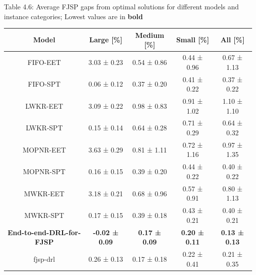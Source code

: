 \begin{table}
    Table 4.6: Average FJSP gaps from optimal solutions for different models and instance categories; Lowest values are in \textbf{bold}\\
    \vspace{1mm}
    \label{table:4.4}
    \footnotesize 
    \begin{tabular}{ccccc}
        \toprule
        Model & Large [\%] & Medium [\%] & Small [\%] & All [\%] \\
        \midrule
        FIFO-EET & 3.03 ± 0.23 & 0.54 ± 0.86 & 0.44 ± 0.96 & 0.67 ± 1.13 \\
        FIFO-SPT & 0.06 ± 0.12 & 0.37 ± 0.20 & 0.41 ± 0.22 & 0.37 ± 0.22 \\
        LWKR-EET & 3.09 ± 0.22 & 0.98 ± 0.83 & 0.91 ± 1.02 & 1.10 ± 1.10 \\
        LWKR-SPT & 0.15 ± 0.14 & 0.64 ± 0.28 & 0.71 ± 0.29 & 0.64 ± 0.32 \\
        MOPNR-EET & 3.63 ± 0.29 & 0.81 ± 1.11 & 0.72 ± 1.16 & 0.97 ± 1.35 \\
        MOPNR-SPT & 0.16 ± 0.15 & 0.39 ± 0.20 & 0.44 ± 0.22 & 0.40 ± 0.22 \\
        MWKR-EET & 3.18 ± 0.21 & 0.68 ± 0.96 & 0.57 ± 0.91 & 0.80 ± 1.13 \\
        MWKR-SPT & 0.17 ± 0.15 & 0.39 ± 0.18 & 0.43 ± 0.21 & 0.40 ± 0.21 \\
        \textbf{End-to-end-DRL-for-FJSP} & \textbf{-0.02 ± 0.09} & \textbf{0.17 ± 0.09} & \textbf{0.20 ± 0.11} & \textbf{0.13 ± 0.13} \\
        fjsp-drl & 0.26 ± 0.13 & 0.17 ± 0.18 & 0.22 ± 0.41 & 0.21 ± 0.35 \\
        \bottomrule
    \end{tabular}
\end{table}

